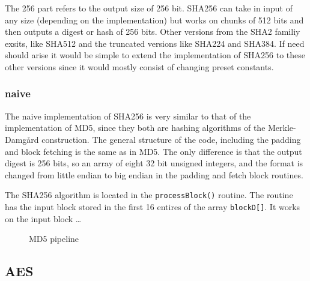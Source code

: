 \documentclass[a4paper]{article}
\begin{document}
The 256 part refers to the output size of 256 bit.
SHA256 can take in input of any size (depending on the implementation) but works
on chunks of 512 bits and then outputs a digest or hash of 256 bits.
Other versions from the SHA2 familiy exsits, like SHA512 and the truncated
versions like SHA224 and SHA384. If need should arise it would be simple to extend
the implementation of SHA256 to these other versions since it would mostly
consist of changing preset constants.

\subsubsection{naive}
\label{sec:org87e03fc}
The naive implementation of SHA256 is very similar to that of the implementation of MD5,
since they both are hashing algorithms of the Merkle-Damgård construction.
The general structure of the code, including the padding and block fetching is the same as in MD5.
The only difference is that the output digest is 256 bits, so an array of eight 32 bit unsigned integers,
and the format is changed from little endian to big endian in the padding and fetch block routines.

The SHA256 algorithm is located in the \texttt{processBlock()} routine.
The routine has the input block stored in the first 16 entires of the array \texttt{blockD[]}.
It works on the input block \ldots{}

\begin{figure}[htbp]
\centering

\caption{\label{fig:org9fed367}MD5 pipeline}
\end{figure}
\subsection{AES}
\label{sec:org9d6b0f3}
\end{document}
